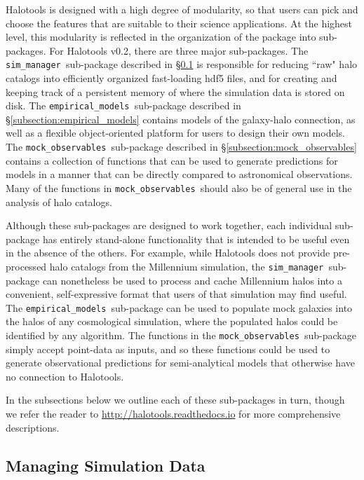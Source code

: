 \documentclass[twocolumn, tighten]{aastex6}
\newcommand{\mockobs}{{\tt mock\_observables }}
\newcommand{\emodels}{{\tt empirical\_models }}
\newcommand{\sims}{{\tt sim\_manager }}
\begin{document}
Halotools is designed with a high degree of modularity, so that users can pick and choose the features that are suitable to their science applications. At the highest level, this modularity is reflected in the organization of the package into sub-packages. For Halotools v0.2, there are three major sub-packages. The \sims sub-package described in \S\ref{subsection:sim_manager} is responsible for reducing ``raw" halo catalogs into efficiently organized fast-loading hdf5 files, and for creating and keeping track of a persistent memory of where the simulation data is stored on disk. The \emodels sub-package described in \S\ref{subsection:empirical_models} contains models of the galaxy-halo connection, as well as a flexible object-oriented platform for users to design their own models. The \mockobs sub-package described in \S\ref{subsection:mock_observables} contains a collection of functions that can be used to generate predictions for models in a manner that can be directly compared to astronomical observations. Many of the functions in \mockobs should also be of general use in the analysis of halo catalogs. 

Although these sub-packages are designed to work together, each individual sub-package has entirely stand-alone functionality that is intended to be useful even in the absence of the others. For example, while Halotools does not provide pre-processed halo catalogs from the Millennium simulation, the \sims sub-package can nonetheless be used to process and cache Millennium halos into a convenient, self-expressive format that users of that simulation may find useful. The \emodels sub-package can be used to populate mock galaxies into the halos of any cosmological simulation, where the populated halos could be identified by any algorithm. The functions in the \mockobs sub-package simply accept point-data as inputs, and so these functions could be used to generate observational predictions for semi-analytical models that otherwise have no connection to Halotools. 

In the subsections below we outline each of these sub-packages in turn, though we refer the reader to \url{http://halotools.readthedocs.io} for more comprehensive descriptions. 

\subsection{Managing Simulation Data}
\label{subsection:sim_manager}
\end{document}
